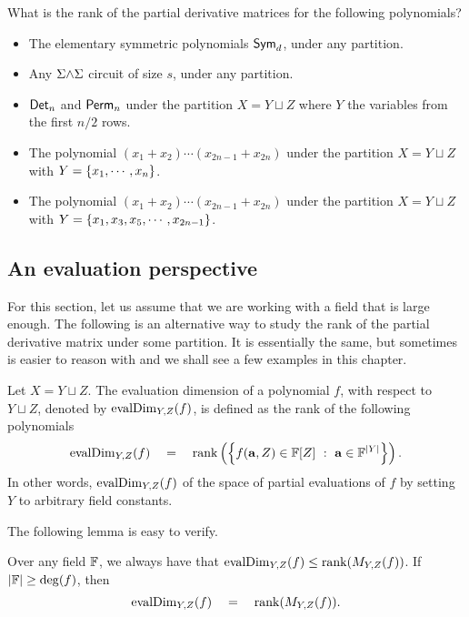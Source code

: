 \begin{exercise}\label{ex:pdm-rank}
What is the rank of the partial derivative matrices for the following polynomials? 
\begin{itemize}
\item The elementary symmetric polynomials $\operatorname{\mathsf{Sym}}_d$, under any partition.
\item Any $\Sigma\mathord{\wedge}\Sigma$ circuit of size $s$, under any partition.
\item $\operatorname{\mathsf{Det}}_n$ and $\operatorname{\mathsf{Perm}}_n$ under the partition $X = Y \sqcup Z$ where $Y$ the variables from the first $n/2$ rows. 
\item The polynomial $(x_1 + x_2) \cdots (x_{2n-1} + x_{2n})$ under the partition $X = Y \sqcup Z$ with $Y = \left\{x_1,\cdots, x_n\right\}$. 
\item The polynomial $(x_1 + x_2) \cdots (x_{2n-1} + x_{2n})$ under the partition $X = Y \sqcup Z$ with $Y = \left\{x_1,x_3,x_5,\cdots, x_{2n-1}\right\}$. 
\end{itemize}
\end{exercise}

\subsection{An evaluation perspective}

For this section, let us assume that we are working with a field that is large enough. The following is an alternative way to study the rank of the partial derivative matrix under some partition. It is essentially the same, but sometimes is easier to reason with and we shall see a few examples in this chapter. 

\begin{definition}
Let $X = Y \sqcup Z$. The evaluation dimension of a polynomial $f$, with respect to $Y \sqcup Z$, denoted by $\operatorname{evalDim}_{Y,Z}(f)$,  is defined as the rank of the following polynomials
\[
\operatorname{evalDim}_{Y,Z}(f) \quad = \quad \operatorname{rank}\left(\left\{{f(\mathbf{a}, Z) \in \mathbb{F}[Z]}\ : \ {\mathbf{a} \in \mathbb{F}^{|Y|}}\right\}\right). 
\]
In other words, $\operatorname{evalDim}_{Y,Z}(f)$ of the space of partial evaluations of $f$ by setting $Y$ to arbitrary field constants. 
\end{definition}

\noindent 
The following lemma is easy to verify.

\begin{lemma}\label{lem:evalDim-to-coeffDim}
Over any field $\mathbb{F}$, we always have that $\operatorname{evalDim}_{Y,Z}(f) \leq \operatorname{rank}(M_{Y,Z}(f))$. If $|\mathbb{F}| \geq \deg(f)$, then
\[
\operatorname{evalDim}_{Y,Z}(f) \quad = \quad \operatorname{rank}(M_{Y,Z}(f)).
\]
\end{lemma}


